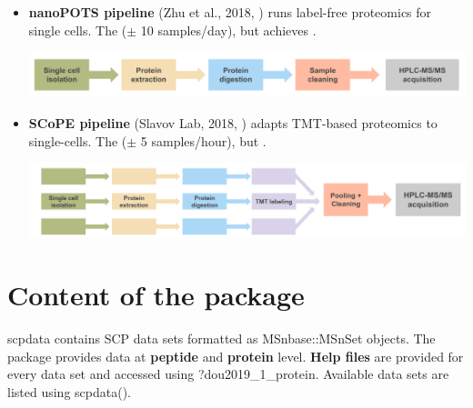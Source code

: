 \documentclass{article}
\newcommand{\hcode}[2][lgray]{{\ttfamily\color{vdgray}\colorbox{#1}{#2}}}
\begin{document}
\begin{multicols}{2}
\begin{minipage}[t]{\linewidth}
  \begin{itemize}
    \item \textbf{\large nanoPOTS pipeline} (Zhu et al., 2018, \cite{Zhu2018-bf}) runs label-free proteomics for single cells. The \textbf{\color{BrickRed}{throughput is low}} ($\pm$ 10 samples/day), but achieves \textbf{\color{OliveGreen}{accurate peptide quantification}}. 
    \vspace{-0.5cm}
    \begin{center}
      \includegraphics[width=0.87\linewidth]{figs/nanopots.png} \\
    \end{center}
    \vspace{-0.5cm}
    \item \textbf{\large SCoPE pipeline} (Slavov Lab, 2018, \cite{Budnik2018-qh}) adapts TMT-based proteomics to single-cells. The \textbf{\color{OliveGreen}{throughput is higher}} ($\pm$ 5 samples/hour), but \textbf{\color{BrickRed}{presence of chemical noise}}.
    \vspace{-0.5cm}
    \begin{center}
      \includegraphics[width=0.9\linewidth]{figs/scopems.png} \\
    \end{center}
  \end{itemize}
  
\end{minipage}

\noindent
\begin{minipage}[t]{\linewidth}
  \vspace{0.55cm}
  \section*{\huge Content of the package}
  
  \large
  \hcode{scpdata} contains SCP data sets formatted as \hcode{MSnbase::MSnSet} objects. The package provides data at \textbf{peptide} and \textbf{protein} level. \textbf{Help files} are provided for every data set and accessed using \hcode{?dou2019\_1\_protein}. Available data sets are listed using \hcode{scpdata()}.
  

\end{minipage}
\end{multicols}
\end{document}

